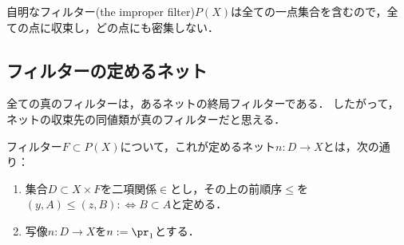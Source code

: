 \documentclass[uplatex,dvipdfmx]{jsreport}
\begin{document}
\begin{example}
    自明なフィルター(the improper filter)$P(X)$は全ての一点集合を含むので，全ての点に収束し，どの点にも密集しない．
\end{example}

\subsection{フィルターの定めるネット}

\begin{tcolorbox}[colframe=ForestGreen, colback=ForestGreen!10!white,breakable,colbacktitle=ForestGreen!40!white,coltitle=black,fonttitle=\bfseries\sffamily,
title=]
    全ての真のフィルターは，あるネットの終局フィルターである．
    したがって，ネットの収束先の同値類が真のフィルターだと思える．
\end{tcolorbox}

\begin{definition}
    フィルター$F\subset P(X)$について，これが定めるネット$n:D\to X$とは，次の通り：
    \begin{enumerate}
        \item 集合$D\subset X\times F$を二項関係$\in$とし，その上の前順序$\le$を$(y,A)\le(z,B):\Leftrightarrow B\subset A$と定める．
        \item 写像$n:D\to X$を$n:=\pr_1$とする．
    \end{enumerate}
\end{definition}
\end{document}
